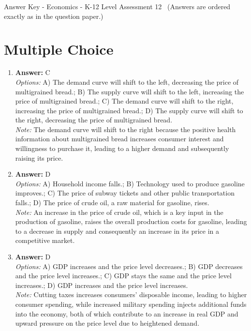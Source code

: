 \documentclass[12pt]{article}
\begin{document}
\begin{center}
Answer Key - Economics - K-12 Level Assessment 12 \
\small (Answers are ordered exactly as in the question paper.)
\end{center}

\section*{Multiple Choice}
\begin{enumerate}[label=\arabic*.]
\item \textbf{Answer:} C
\\ \textit{Options:} A) The demand curve will shift to the left, decreasing the price of multigrained bread.; B) The supply curve will shift to the left, increasing the price of multigrained bread.; C) The demand curve will shift to the right, increasing the price of multigrained bread.; D) The supply curve will shift to the right, decreasing the price of multigrained bread.
\\ \textit{Note:} The demand curve will shift to the right because the positive health information about multigrained bread increases consumer interest and willingness to purchase it, leading to a higher demand and subsequently raising its price.
\item \textbf{Answer:} D
\\ \textit{Options:} A) Household income falls.; B) Technology used to produce gasoline improves.; C) The price of subway tickets and other public transportation falls.; D) The price of crude oil, a raw material for gasoline, rises.
\\ \textit{Note:} An increase in the price of crude oil, which is a key input in the production of gasoline, raises the overall production costs for gasoline, leading to a decrease in supply and consequently an increase in its price in a competitive market.
\item \textbf{Answer:} D
\\ \textit{Options:} A) GDP increases and the price level decreases.; B) GDP decreases and the price level increases.; C) GDP stays the same and the price level increases.; D) GDP increases and the price level increases.
\\ \textit{Note:} Cutting taxes increases consumers' disposable income, leading to higher consumer spending, while increased military spending injects additional funds into the economy, both of which contribute to an increase in real GDP and upward pressure on the price level due to heightened demand.

\end{enumerate}
\end{document}
